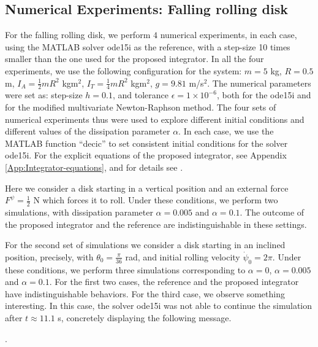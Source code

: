 \documentclass{aims}
\numberwithin{equation}{section}
\theoremstyle{definition}
\begin{document}
\subsection{Numerical Experiments: Falling rolling disk} For the falling rolling disk, we perform $4$ numerical experiments, in each case, using the MATLAB solver ode15i as the reference, with a step-size 10 times smaller than the one used for the proposed integrator. In all the four experiments, we use the following configuration for the system: $m = 5$ kg, $R = 0.5$ m, $I_A = \frac{1}{2}mR^2$ kgm$^2$, $I_T = \frac{1}{4}mR^2$ kgm$^2$, $g = 9.81$ m/s$^2$. The numerical parameters were set as: step-size $h = 0.1$, and tolerance $\epsilon = 1\times 10^{-6}$, both for the ode15i and for the modified multivariate Newton-Raphson method. The four sets of numerical experiments thus were used to explore different initial conditions and different values of the dissipation parameter $\alpha$. In each case, we use the MATLAB function ``decic'' to set consistent initial conditions for the solver ode15i. For the explicit equations of the proposed integrator, see Appendix \ref{App:Integrator-equations}, and for details see \cite{maciel2021propuesta}.

\vskip 2mm
 Here we consider a disk starting in a vertical position and an external force $F^\psi = \frac{1}{2}$ N which forces it to roll. Under these conditions, we perform two simulations, with dissipation parameter $\alpha = 0.005$ and $\alpha = 0.1$. The outcome of the proposed integrator and the reference are indistinguishable in these settings.

\vskip 2mm
 For the second set of simulations we consider a disk starting in an inclined position, precisely, with $\theta_0 = \frac{\pi}{36}$ rad, and initial rolling velocity $\dot{\psi}_0 = 2\pi$. Under these conditions, we perform three simulations corresponding to $\alpha = 0$, $\alpha = 0.005$ and $\alpha = 0.1$. For the first two cases, the reference and the proposed integrator have indistinguishable behaviors. For the third case, we observe something interesting. In this case, the solver ode15i was not able to continue the simulation after $t\approx 11.1$ s, concretely displaying the following message.

.
\end{document}
